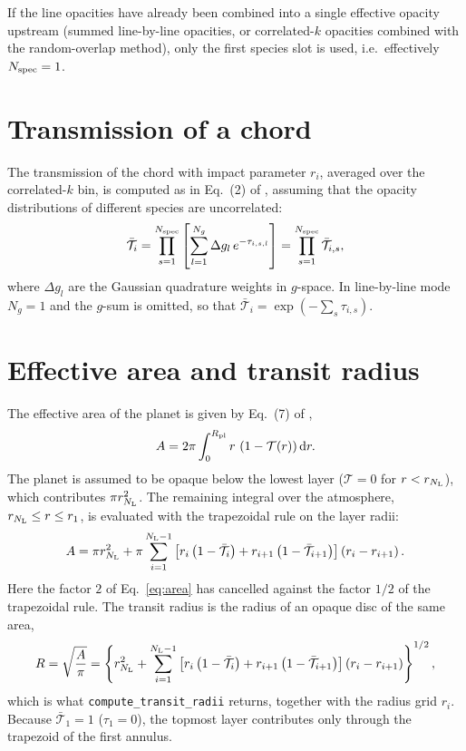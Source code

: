\documentclass[11pt,a4paper]{article}
\newcommand{\Rpl}{R_{\rm pl}}
\newcommand{\Ntot}{N_{\rm L}}
\newcommand{\Nspec}{N_{\rm spec}}
\newcommand{\Trans}{\mathcal{T}}
\newcommand{\code}[1]{\texttt{#1}}
\begin{document}
If the line opacities have already been combined into a single effective
opacity upstream (summed line-by-line opacities, or correlated-$k$
opacities combined with the random-overlap method), only the first species
slot is used, i.e.\ effectively $\Nspec = 1$.

\section{Transmission of a chord}
\label{sec:transmission}

The transmission of the chord with impact parameter $r_i$, averaged over the
correlated-$k$ bin, is computed as in Eq.~(2) of \citet{molliere2019},
assuming that the opacity distributions of different species are
uncorrelated:
\begin{equation}
  \bar{\Trans}_i = \prod_{s=1}^{\Nspec}
  \left[\sum_{l=1}^{N_g} \Delta g_l\, e^{-\tau_{i,s,l}}\right]
  = \prod_{s=1}^{\Nspec} \bar{\Trans}_{i,s} ,
  \label{eq:transm}
\end{equation}
where $\Delta g_l$ are the Gaussian quadrature weights in $g$-space. In
line-by-line mode $N_g = 1$ and the $g$-sum is omitted, so that
$\bar{\Trans}_i = \exp(-\sum_s\tau_{i,s})$.

\section{Effective area and transit radius}
\label{sec:area}

The effective area of the planet is given by Eq.~(7) of
\citet{molliere2019},
\begin{equation}
  A = 2\pi\int_0^{\Rpl} r\,\left(1 - \Trans(r)\right)\mathrm{d}r .
  \label{eq:area}
\end{equation}
The planet is assumed to be opaque below the lowest layer
($\Trans = 0$ for $r < r_{\Ntot}$), which contributes $\pi r_{\Ntot}^2$.
The remaining integral over the atmosphere, $r_{\Ntot} \le r \le r_1$, is
evaluated with the trapezoidal rule on the layer radii:
\begin{equation}
  A = \pi r_{\Ntot}^2
  + \pi\sum_{i=1}^{\Ntot-1}
  \left[r_i\left(1-\bar{\Trans}_i\right)
      + r_{i+1}\left(1-\bar{\Trans}_{i+1}\right)\right]
  \left(r_i - r_{i+1}\right).
  \label{eq:area_disc}
\end{equation}
Here the factor $2$ of Eq.~\eqref{eq:area} has cancelled against the factor
$1/2$ of the trapezoidal rule. The transit radius is the radius of an opaque
disc of the same area,
\begin{equation}
  R = \sqrt{\frac{A}{\pi}} =
  \left\{ r_{\Ntot}^2 + \sum_{i=1}^{\Ntot-1}
  \left[r_i\left(1-\bar{\Trans}_i\right)
      + r_{i+1}\left(1-\bar{\Trans}_{i+1}\right)\right]
  \left(r_i - r_{i+1}\right) \right\}^{1/2} ,
  \label{eq:radius}
\end{equation}
which is what \code{compute\_transit\_radii} returns, together with the
radius grid $r_i$. Because $\bar{\Trans}_1 = 1$ ($\tau_1 = 0$), the topmost
layer contributes only through the trapezoid of the first annulus.
\end{document}
